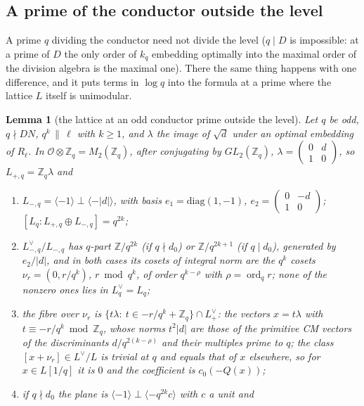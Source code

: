 \documentclass[11pt,reqno]{amsart}
\theoremstyle{plain}
\newtheorem{lemma}[theorem]{Lemma}
\theoremstyle{definition}
\DeclareMathOperator{\ord}{ord}
\newcommand{\Z}{\mathbb{Z}}
\newcommand{\Ldual}{L^{\vee}}
\newcommand{\Lp}{L_{+}}
\begin{document}
\subsection*{A prime of the conductor outside the level}

A prime $q$ dividing the conductor need not divide the level ($q\mid D$ is impossible: at a prime
of $D$ the only order of $k_q$ embedding optimally into the maximal order of the division algebra is
the maximal one). There the same thing happens with one difference, and it puts terms in $\log q$
into the formula at a prime where the lattice $L$ itself is unimodular.

\begin{lemma}[the lattice at an odd conductor prime outside the level]\label{lem:unimod}
Let $q$ be odd, $q\nmid DN$, $q^k\,\|\,\ell$ with $k\ge1$, and $\lambda$ the image of $\sqrt d$ under
an optimal embedding of $R_\ell$. In $\mathcal O\otimes\Z_q=M_2(\Z_q)$, after conjugating by
$GL_2(\Z_q)$, $\lambda=\begin{pmatrix}0&d\\1&0\end{pmatrix}$, so $L_{+,q}=\Z_q\lambda$ and
\begin{enumerate}
\item $L_{-,q}=\langle-1\rangle\perp\langle-\lvert d\rvert\rangle$, with basis $e_1=\mathrm{diag}
      (1,-1)$, $e_2=\begin{pmatrix}0&-d\\1&0\end{pmatrix}$; $[L_q:L_{+,q}\oplus L_{-,q}]=q^{2k}$;
\item $L_{-,q}^\vee/L_{-,q}$ has $q$-part $\Z/q^{2k}$ (if $q\nmid d_0$) or $\Z/q^{2k+1}$ (if
      $q\mid d_0$), generated by $e_2/\lvert d\rvert$, and in both cases its cosets of integral norm are
      the $q^k$ cosets $\nu_r=(0,r/q^k)$, $r\bmod q^k$, of order $q^{k-\rho}$ with $\rho=\ord_qr$;
      \emph{none} of the nonzero ones lies in $L_q^\vee=L_q$;
\item the fibre over $\nu_r$ is $\{t\lambda:\ t\in-r/q^k+\Z_q\}\cap\Lp^\vee$: the vectors
      $x=t\lambda$ with $t\equiv-r/q^k\bmod\Z_q$, whose norms $t^2\lvert d\rvert$ are those of the
      primitive CM vectors of the discriminants $d/q^{2(k-\rho)}$ and their multiples prime to $q$;
      the class $[x+\nu_r]\in\Ldual/L$ is trivial at $q$ and equals that of $x$ elsewhere, so for
      $x\in L[1/q]$ it is $0$ and the coefficient is $c_0(-Q(x))$;
\item if $q\nmid d_0$ the plane is $\langle-1\rangle\perp\langle-q^{2k}c\rangle$ with $c$ a unit and

\end{enumerate}
\end{lemma}
\end{document}
